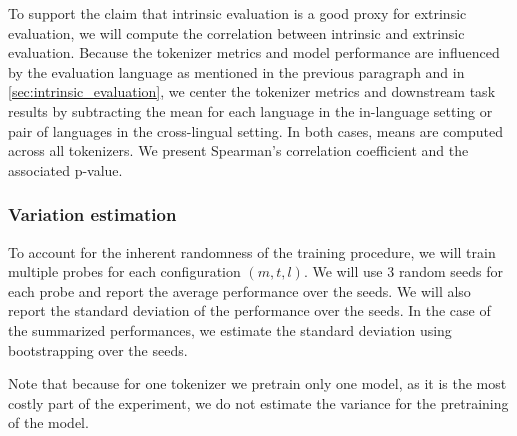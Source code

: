 To support the claim that intrinsic evaluation is a good proxy for extrinsic evaluation, we will compute the correlation between intrinsic and extrinsic evaluation. Because the tokenizer metrics and model performance are influenced by the evaluation language as mentioned in the previous paragraph and in \autoref{sec:intrinsic_evaluation}, we center the tokenizer metrics and downstream task results by subtracting the mean for each language in the in-language setting or pair of languages in the cross-lingual setting. In both cases, means are computed across all tokenizers. We present Spearman’s correlation coefficient and the associated p-value.

\subsubsection{Variation estimation}

To account for the inherent randomness of the training procedure, we will train multiple probes for each configuration $(m, t, l)$. We will use 3 random seeds for each probe and report the average performance over the seeds. We will also report the standard deviation of the performance over the seeds. In the case of the summarized performances, we estimate the standard deviation using bootstrapping over the seeds.

Note that because for one tokenizer we pretrain only one model, as it is the most costly part of the experiment, we do not estimate the variance for the pretraining of the model.





